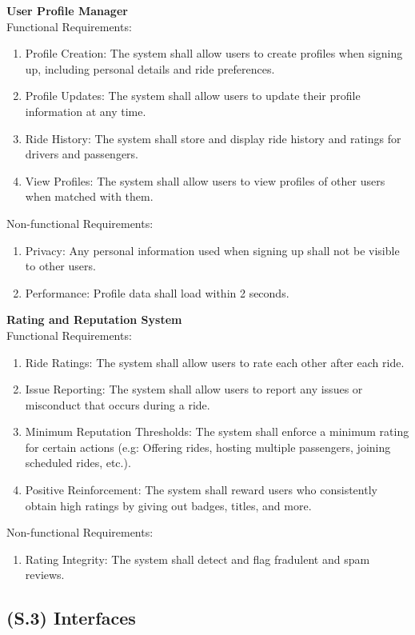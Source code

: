 \documentclass[12pt,letterpaper]{article}
\begin{document}
\vspace{1em}
\noindent \textbf{User Profile Manager} \\
Functional Requirements:
\begin{enumerate}
  \item Profile Creation: The system shall allow users to create profiles when signing up, including personal details and ride preferences.
  \item Profile Updates: The system shall allow users to update their profile information at any time.
  \item Ride History: The system shall store and display ride history and ratings for drivers and passengers.
  \item View Profiles: The system shall allow users to view profiles of other users when matched with them.
\end{enumerate}
Non-functional Requirements:
\begin{enumerate}
  \item Privacy: Any personal information used when signing up shall not be visible to other users.
  \item Performance: Profile data shall load within 2 seconds.
\end{enumerate}

\noindent \textbf{Rating and Reputation System} \\
Functional Requirements:
\begin{enumerate}
  \item Ride Ratings: The system shall allow users to rate each other after each ride.
  \item Issue Reporting: The system shall allow users to report any issues or misconduct that occurs during a ride.
  \item Minimum Reputation Thresholds: The system shall enforce a minimum rating for certain actions (e.g: Offering rides, hosting multiple passengers, joining scheduled rides, etc.).
  \item Positive Reinforcement: The system shall reward users who consistently obtain high ratings by giving out badges, titles, and more.
\end{enumerate}
Non-functional Requirements:
\begin{enumerate}
  \item Rating Integrity: The system shall detect and flag fradulent and spam reviews. 
\end{enumerate}


\subsection{(S.3) Interfaces} %
\end{document}
